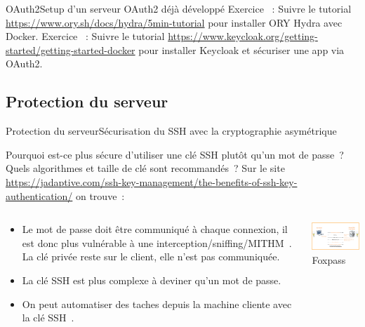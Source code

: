 \documentclass{beamer}
\begin{document}
    \begin{frame}{OAuth2}{Setup d'un serveur OAuth2 déjà développé}
        Exercice \execcounterdispinc{}~:
        Suivre le tutorial \url{https://www.ory.sh/docs/hydra/5min-tutorial} pour installer ORY Hydra avec Docker.
        \bigbreak
        Exercice \execcounterdispinc{}~:
        Suivre le tutorial \url{https://www.keycloak.org/getting-started/getting-started-docker} pour installer Keycloak et sécuriser une app via OAuth2.
    \end{frame}

    \subsection{Protection du serveur}\label{subsec:protection-serveur}
    \begin{frame}{Protection du serveur}{Sécurisation du SSH avec la cryptographie asymétrique}
        \begin{footnotesize}
            Pourquoi est-ce plus sécure d'utiliser une clé SSH plutôt qu'un mot de passe~?
            \bigbreak
            Quels algorithmes et taille de clé sont recommandés~?
            \pause
            \bigbreak
            Sur le site \url{https://jadaptive.com/ssh-key-management/the-benefits-of-ssh-key-authentication/} on trouve~:
            \begin{columns}
                \begin{column}{0.6\textwidth}
                    \begin{itemize}
                        \item Le mot de passe doit être communiqué à chaque connexion, il est donc plus vulnérable à une interception/sniffing/MITHM~.
                        La clé privée reste sur le client, elle n'est pas communiquée.
                        \item La clé SSH est plus complexe à deviner qu'un mot de passe.
                        \item On peut automatiser des taches depuis la machine cliente avec la clé SSH~.
                    \end{itemize}
                \end{column}
                \begin{column}{0.4\textwidth}
                    \centering
                    \includegraphics[width=5cm]{image/ssh-key-diagram} \\ Foxpass\footnotemark \\

\end{column}
\end{columns}
\end{footnotesize}
\end{frame}
\end{document}

